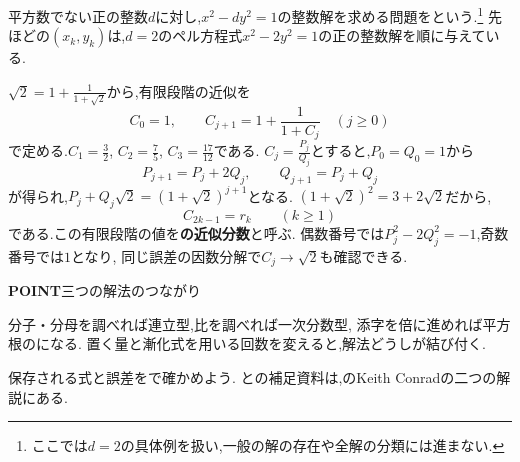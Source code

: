 平方数でない正の整数$d$に対し,$x^2-dy^2=1$の整数解を求める問題を\textbf{}という.\footnote{ここでは$d=2$の具体例を扱い,一般の解の存在や全解の分類には進まない.}
先ほどの$(x_k,y_k)$は,$d=2$のペル方程式$x^2-2y^2=1$の正の整数解を順に与えている.

$\sqrt2=1+\frac1{1+\sqrt2}$から,有限段階の近似を
\[
  C_0=1,\qquad C_{j+1}=1+\frac1{1+C_j}
  \quad(j\ge0)
\]
で定める.$C_1=\frac{3}{2}$, $C_2=\frac{7}{5}$, $C_3=\frac{17}{12}$である.
$C_j=\frac{P_j}{Q_j}$とすると,$P_0=Q_0=1$から
\[
  P_{j+1}=P_j+2Q_j,\qquad Q_{j+1}=P_j+Q_j
\]
が得られ,$P_j+Q_j\sqrt2=(1+\sqrt2)^{j+1}$となる.
$(1+\sqrt2)^2=3+2\sqrt2$だから,
\[
  C_{2k-1}=r_k\qquad(k\ge1)
\]
である.この有限段階の値を\textbf{の近似分数}と呼ぶ.
偶数番号では$P_j^2-2Q_j^2=-1$,奇数番号では$1$となり,
同じ誤差の因数分解で$C_j\to\sqrt2$も確認できる.

\begin{bookpoint}
  \textbf{POINT}\quad 三つの解法のつながり\par
  分子・分母を調べれば連立型,比を調べれば一次分数型,
  添字を倍に進めれば平方根のになる.
  置く量と漸化式を用いる回数を変えると,解法どうしが結び付く.
\end{bookpoint}
保存される式と誤差をで確かめよう.
との補足資料は,のKeith Conradの二つの解説にある.
